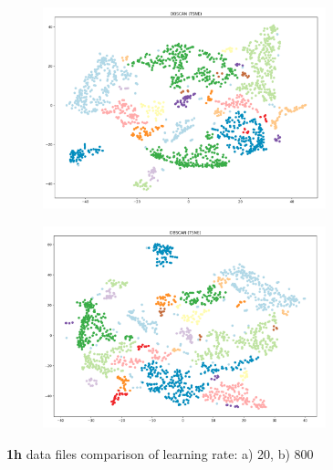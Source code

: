 \begin{figure}[H]
  \centering
  \begin{subfigure}{.5\textwidth}
    \centering
    \includegraphics[width=0.9\textwidth]{./images/tsneParametersTest/learningRate/lr201h-DBSCANCompare.png}
  \end{subfigure}%
  \begin{subfigure}{.5\textwidth}
    \centering
    \includegraphics[width=0.9\textwidth]{./images/tsneParametersTest/learningRate/lr8001h-DBSCANCompare.png}
  \end{subfigure}
	\caption{\textbf{1h} data files comparison of learning rate: a) 20, b) 800}
	\label{figure:1h-learningRateComparison20and800}
\end{figure}
